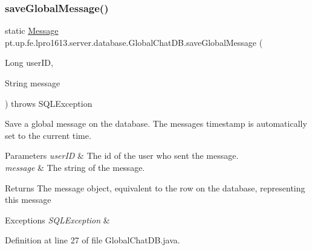 \subsubsection{\texorpdfstring{save\+Global\+Message()}{saveGlobalMessage()}}
{\footnotesize\ttfamily static \hyperlink{classpt_1_1up_1_1fe_1_1lpro1613_1_1sharedlib_1_1structs_1_1_message}{Message} pt.\+up.\+fe.\+lpro1613.\+server.\+database.\+Global\+Chat\+D\+B.\+save\+Global\+Message (\begin{DoxyParamCaption}\item[{Long}]{user\+ID,  }\item[{String}]{message }\end{DoxyParamCaption}) throws S\+Q\+L\+Exception\hspace{0.3cm}{\ttfamily [static]}}

Save a global message on the database. The message\textquotesingle{}s timestamp is automatically set to the current time.


\begin{DoxyParams}{Parameters}
{\em user\+ID} & The id of the user who sent the message. \\
\hline
{\em message} & The string of the message. \\
\hline
\end{DoxyParams}
\begin{DoxyReturn}{Returns}
The message object, equivalent to the row on the database, representing this message 
\end{DoxyReturn}

\begin{DoxyExceptions}{Exceptions}
{\em S\+Q\+L\+Exception} & \\
\hline
\end{DoxyExceptions}


Definition at line 27 of file Global\+Chat\+D\+B.\+java.

